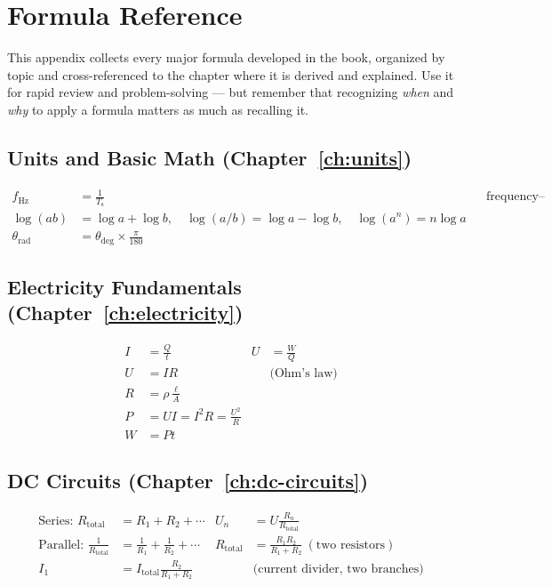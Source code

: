 \chapter{Formula Reference}
\label{app:formulae}

This appendix collects every major formula developed in the book,
organized by topic and cross-referenced to the chapter where it is
derived and explained. Use it for rapid review and problem-solving ---
but remember that recognizing \emph{when} and \emph{why} to apply a
formula matters as much as recalling it.

\section*{Units and Basic Math (Chapter~\ref{ch:units})}
\begin{align*}
f_{\text{Hz}} &= \frac{1}{T_{\text{s}}} &&\text{frequency--period} \\
\log(ab) &= \log a + \log b, \quad \log(a/b) = \log a - \log b, \quad \log(a^n) = n\log a \\
\theta_{\text{rad}} &= \theta_{\text{deg}}\times\frac{\pi}{180}
\end{align*}

\section*{Electricity Fundamentals (Chapter~\ref{ch:electricity})}
\begin{align*}
I &= \frac{Q}{t} & U &= \frac{W}{Q} \\
U &= IR &&\text{(Ohm's law)} \\
R &= \rho\frac{\ell}{A} \\
P &= UI = I^2R = \frac{U^2}{R} \\
W &= Pt
\end{align*}

\section*{DC Circuits (Chapter~\ref{ch:dc-circuits})}
\begin{align*}
\text{Series: } R_{\text{total}} &= R_1+R_2+\cdots & U_n &= U\frac{R_n}{R_{\text{total}}} \\
\text{Parallel: } \frac{1}{R_{\text{total}}} &= \frac{1}{R_1}+\frac{1}{R_2}+\cdots &
R_{\text{total}} &= \frac{R_1R_2}{R_1+R_2}\ (\text{two resistors}) \\
I_1 &= I_{\text{total}}\frac{R_2}{R_1+R_2} &&\text{(current divider, two branches)}
\end{align*}

